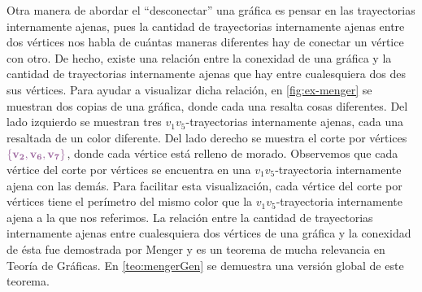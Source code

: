 Otra manera de abordar el ``desconectar'' una gr\'afica es  pensar en las
trayectorias internamente ajenas, pues la cantidad de trayectorias internamente
ajenas entre dos v\'ertices nos habla de cu\'antas maneras diferentes hay de
conectar un v\'ertice con otro. De hecho, existe una relaci\'on entre la
conexidad de una gr\'afica y la cantidad de trayectorias internamente ajenas que
hay entre cualesquiera dos des sus v\'ertices. Para ayudar a visualizar dicha
relaci\'on, en \cref{fig:ex-menger} se muestran dos copias de una gr\'afica,
donde cada una resalta cosas diferentes. Del lado izquierdo se muestran tres
$v_1v_5$-trayectorias internamente ajenas, cada una resaltada de un color
diferente. Del lado derecho se muestra el corte por v\'ertices
${\color{morado}\bf \{v_2, v_6, v_7\} }$, donde cada v\'ertice est\'a relleno de
morado. Observemos que cada v\'ertice del corte por v\'ertices se encuentra en
una $v_1v_5$-trayectoria internamente ajena con las dem\'as. Para facilitar esta
visualizaci\'on, cada v\'ertice del corte por v\'ertices tiene el per\'imetro
del mismo color que la $v_1v_5$-trayectoria internamente ajena a la que nos
referimos. La relaci\'on entre la cantidad de trayectorias internamente ajenas
entre cualesquiera dos v\'ertices de una gr\'afica y la conexidad de \'esta fue
demostrada por Menger y es un teorema de mucha relevancia en Teor\'ia de
Gr\'aficas. En \cref{teo:mengerGen} se demuestra una versi\'on global de este
teorema. 

